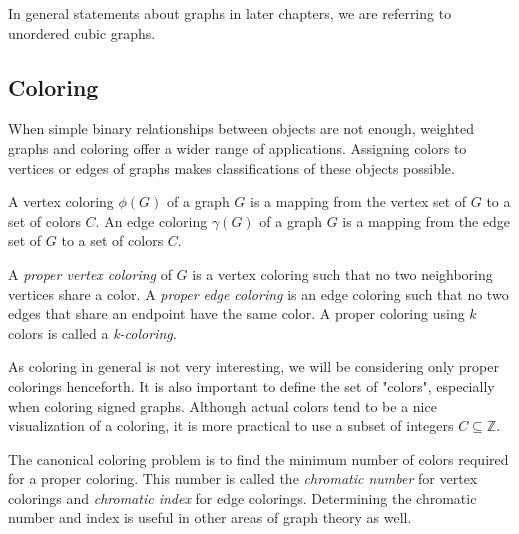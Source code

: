 \begin{figure}[h]
    \centering
\end{figure}

In general statements about graphs in later chapters, we are referring to unordered cubic graphs.

\subsection{Coloring}

When simple binary relationships between objects are not enough, weighted graphs and coloring offer a wider range of applications. Assigning colors to vertices or edges of graphs makes classifications of these objects possible.

\begin{definition}
    A vertex coloring $\phi(G)$ of a graph $G$ is a mapping from the vertex set of $G$ to a set of colors $C$. An edge coloring $\gamma(G)$ of a graph $G$ is a mapping from the edge set of $G$ to a set of colors $C$.
\end{definition}

\begin{definition}
    A \textit{proper vertex coloring} of $G$ is a vertex coloring such that no two neighboring vertices share a color. A \textit{proper edge coloring} is an edge coloring such that no two edges that share an endpoint have the same color. A proper coloring using $k$ colors is called a \textit{k-coloring}.
\end{definition}

As coloring in general is not very interesting, we will be considering only proper colorings henceforth. It is also important to define the set of "colors", especially when coloring signed graphs. Although actual colors tend to be a nice visualization of a coloring, it is more practical to use a subset of integers $C \subseteq \mathbb{Z}$.

The canonical coloring problem is to find the minimum number of colors required for a proper coloring. This number is called the \textit{chromatic number} for vertex colorings and \textit{chromatic index} for edge colorings. Determining the chromatic number and index is useful in other areas of graph theory as well.

